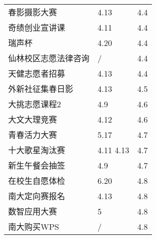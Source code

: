 \documentclass[letterpaper, 12pt]{article}
\begin{document}
\begin{multicols}{2}
{\begin{longtable}{|>{\centering\arraybackslash}m{}|m{}|m{}|}
    春影摄影大赛 & 4.13 & 4.4\\
    奇绩创业宣讲课 & 4.11 & 4.4\\
    瑞声杯 & 4.20 & 4.4\\
    仙林校区志愿法律咨询 & / & 4.4\\
    天健志愿者招募 & 4.13 & 4.4\\
    外新社征集春日影 & 4.13 & 4.5\\
    大挑志愿课程2 & 4.9 & 4.6\\
    大文大理竞赛 & 4.12 & 4.6\\
    青春活力大赛 & 5.17 & 4.7\\
    十大歌星淘汰赛 & 4.11 4.13 & 4.7\\
    新生午餐会抽签 & 4.9 & 4.7\\
    在校生自愿体检 & 6.20 & 4.8\\
    南大定向赛报名 & 4.13 & 4.8\\
    数智应用大赛 & 5 & 4.8\\
    南大购买WPS & / & 4.8\\
    \hline
\end{longtable}
\unskip
\unpenalty
\unpenalty}\unvbox\colbbox
\end{multicols}
\end{document}
